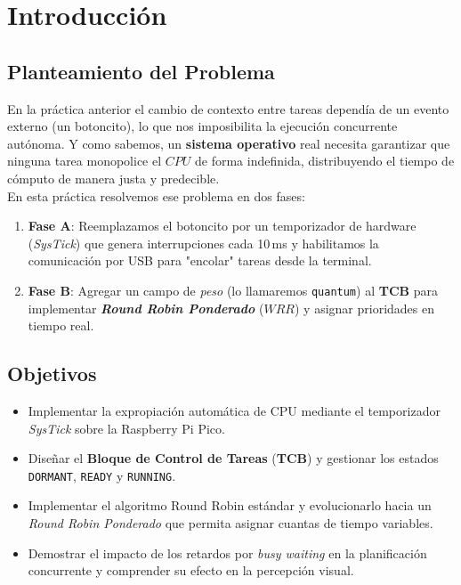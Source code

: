 \documentclass[12pt,letterpaper]{article}
\begin{document}


\newpage

\section*{Introducción}
 
\subsection*{Planteamiento del Problema}
 
En la práctica anterior el cambio de contexto entre tareas dependía de un evento externo (un botoncito), lo que nos imposibilita la ejecución concurrente autónoma. Y como sabemos, un \textbf{sistema operativo} real necesita garantizar que ninguna tarea monopolice el $CPU$ de forma indefinida, distribuyendo el tiempo de cómputo de manera justa y predecible.\\
 
En esta práctica resolvemos ese problema en dos fases:
\begin{enumerate}[label=\textbf{\arabic*.}]
\item \textbf{Fase A}: Reemplazamos el botoncito por un temporizador de hardware (\textit{SysTick}) que genera interrupciones cada 10\,ms y habilitamos la comunicación por USB para "encolar" tareas desde la terminal.
\item \textbf{Fase B}: Agregar un campo de \textit{peso} (lo llamaremos \texttt{quantum}) al \textbf{TCB} para implementar \textit{\textbf{Round Robin Ponderado}} ($WRR$) y asignar prioridades en tiempo real.
\end{enumerate}
 
\subsection*{Objetivos}
\begin{itemize}
\item Implementar la expropiación automática de CPU mediante el temporizador \textit{SysTick} sobre la Raspberry Pi Pico.
\item Diseñar el \textbf{Bloque de Control de Tareas} (\textbf{TCB}) y gestionar los estados \texttt{DORMANT}, \texttt{READY} y \texttt{RUNNING}.
\item Implementar el algoritmo Round Robin estándar y evolucionarlo hacia un \textit{Round Robin Ponderado} que permita asignar cuantas de tiempo variables.
\item Demostrar el impacto de los retardos por \textit{busy waiting} en la planificación concurrente y comprender su efecto en la percepción visual.
\end{itemize}
 
\end{document}
